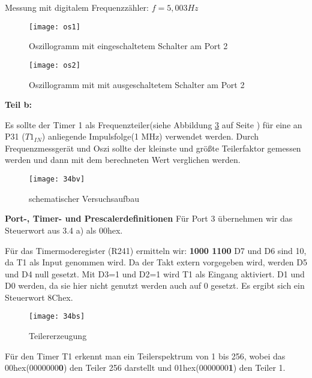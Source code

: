 Messung mit digitalem Frequenzzähler: $f=5,003 Hz$


\begin{figure}[!ht]
\begin{center}
\texttt{[image: os1]} 
\caption{Oszillogramm mit eingeschaltetem Schalter am Port 2}
\label{os34a1}
\end{center}
\end{figure}


\begin{figure}[!ht]
\begin{center}
\texttt{[image: os2]} 
\caption{Oszillogramm mit mit ausgeschaltetem Schalter am Port 2}
\label{os34a2}
\end{center}
\end{figure}


\newpage

\textbf{Teil b:}

Es sollte der Timer 1 als Frequenzteiler(siehe Abbildung \ref{34bv} auf Seite \pageref{34bv}) für eine an P31 ($T1_{IN}$) anliegende Impulsfolge(1 MHz) verwendet werden. Durch Frequenzmessgerät und Oszi sollte der kleinste und größte Teilerfaktor gemessen werden und dann mit dem berechneten Wert verglichen werden.

\begin{figure}[!ht]
\begin{center}
\texttt{[image: 34bv]} 
\caption{schematischer Versuchsaufbau}
\label{34bv}
\end{center}
\end{figure}


\textbf{Port-, Timer- und Prescalerdefinitionen}
Für Port 3 übernehmen wir das Steuerwort aus 3.4 a) als 00hex.

Für das Timermoderegister (R241) ermitteln wir: \textbf{1000 1100}
D7 und D6 sind 10, da T1 als Input genommen wird.
Da der Takt extern vorgegeben wird, werden D5 und D4 null gesetzt.
Mit D3=1 und D2=1 wird T1 als Eingang aktiviert.
D1 und D0 werden, da sie hier nicht genutzt werden auch auf 0 gesetzt.
Es ergibt sich ein Steuerwort 8Chex.

\begin{figure}[!ht]
\begin{center}
\texttt{[image: 34bs]} 
\caption{Teilererzeugung}
\label{34bs}
\end{center}
\end{figure}


Für den Timer T1 erkennt man ein Teilerspektrum von 1 bis 256, wobei das 00hex(0000000\textbf{0}) den Teiler 256 darstellt und 01hex(0000000\textbf{1}) den Teiler 1.

